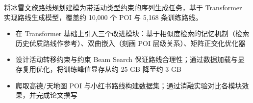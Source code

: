 将冰雪文旅路线规划建模为带活动类型约束的序列生成任务，基于 Transformer 实现路线生成模型，覆盖约 10{,}000 个 POI 与 5{,}168 条训练路线。
\begin{itemize}[parsep=0.3ex]
  \item 在 Transformer 基础上引入三个改进模块：基于相似度检索的记忆机制（检索历史优质路线作参考）、双曲嵌入（刻画 POI 层级关系）、矩阵正交化优化器
  \item 设计活动转移约束与约束 Beam Search 保证路线合理性；通过数据加载与显存复用优化，将训练峰值显存从约 25 GB 降至约 3 GB
  \item 爬取高德/天地图 POI 与小红书路线构建数据集；通过消融实验对比各模块效果，并完成论文撰写
\end{itemize}

